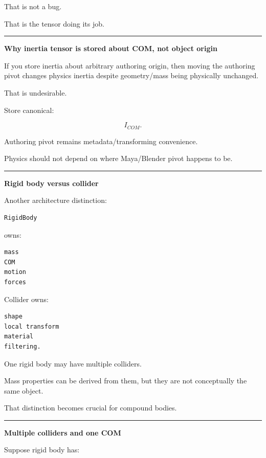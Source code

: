 That is not a bug.

That is the tensor doing its job.

\begin{center}\rule{0.5\linewidth}{0.5pt}\end{center}

\textbf{Why inertia tensor is stored about COM, not object origin}

If you store inertia about arbitrary authoring origin, then moving the authoring pivot changes physics inertia despite geometry/mass being physically unchanged.

That is undesirable.

Store canonical:

\[
I_{COM}.
\]

Authoring pivot remains metadata/transforming convenience.

Physics should not depend on where Maya/Blender pivot happens to be.

\begin{center}\rule{0.5\linewidth}{0.5pt}\end{center}

\textbf{Rigid body versus collider}

Another architecture distinction:

\begin{verbatim}
RigidBody
\end{verbatim}

owns:

\begin{verbatim}
mass
COM
motion
forces
\end{verbatim}

Collider owns:

\begin{verbatim}
shape
local transform
material
filtering.
\end{verbatim}

One rigid body may have multiple colliders.

Mass properties can be derived from them, but they are not conceptually the same object.

That distinction becomes crucial for compound bodies.

\begin{center}\rule{0.5\linewidth}{0.5pt}\end{center}

\textbf{Multiple colliders and one COM}

Suppose rigid body has:

